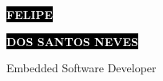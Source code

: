 \documentclass[9pt]{developercv} %
\begin{document}

\begin{minipage}[t]{0.5\textwidth} %
	\vspace{-\baselineskip} %
	
	\colorbox{black}{{\HUGE\textcolor{white}{\textbf{\MakeUppercase{Felipe}}}}} %
	
	\colorbox{black}{{\large\textcolor{white}{\textbf{\MakeUppercase{dos Santos Neves}}}}} %
	
	\vspace{6pt}
	
	{\huge Embedded Software Developer} %
\end{minipage}
\begin{minipage}[t]{0.5\textwidth} %
	\vspace{-\baselineskip} %
	
	\\
	\\
	\\	
\end{minipage}

\vspace{0.5cm}

\end{document}
